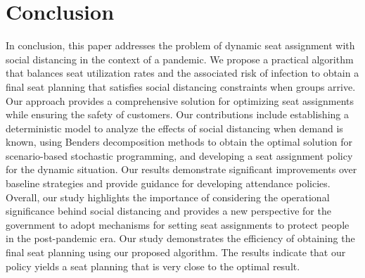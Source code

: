 \section{Conclusion}
In conclusion, this paper addresses the problem of dynamic seat assignment with social distancing in the context of a pandemic. We propose a practical algorithm that balances seat utilization rates and the associated risk of infection to obtain a final seat planning that satisfies social distancing constraints when groups arrive. Our approach provides a comprehensive solution for optimizing seat assignments while ensuring the safety of customers. Our contributions include establishing a deterministic model to analyze the effects of social distancing when demand is known, using Benders decomposition methods to obtain the optimal solution for scenario-based stochastic programming, and developing a seat assignment policy for the dynamic situation. Our results demonstrate significant improvements over baseline strategies and provide guidance for developing attendance policies. Overall, our study highlights the importance of considering the operational significance behind social distancing and provides a new perspective for the government to adopt mechanisms for setting seat assignments to protect people in the post-pandemic era. Our study demonstrates the efficiency of obtaining the final seat planning using our proposed algorithm. The results indicate that our policy yields a seat planning that is very close to the optimal result. 



